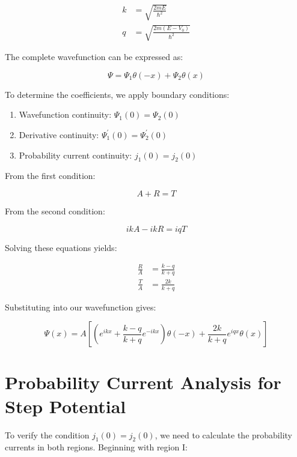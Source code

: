 \begin{align}
k & =\sqrt{\frac{2 m E}{\hbar^{2}}}  \\
q & =\sqrt{\frac{2 m\left(E-V_{0}\right)}{\hbar^{2}}}
\end{align}

The complete wavefunction can be expressed as:

\begin{equation}
\Psi=\Psi_{1} \theta(-x)+\Psi_{2} \theta(x)
\end{equation}

To determine the coefficients, we apply boundary conditions:

\begin{enumerate}
  \item Wavefunction continuity: $\Psi_{1}(0)=\Psi_{2}(0)$
  \item Derivative continuity: $\Psi_{1}^{\prime}(0)=\Psi_{2}^{\prime}(0)$
  \item Probability current continuity: $j_{1}(0)=j_{2}(0)$
\end{enumerate}

From the first condition:

\begin{equation}
A+R=T
\end{equation}

From the second condition:

\begin{equation}
i k A-i k R=i q T
\end{equation}

Solving these equations yields:

\begin{align}
\frac{R}{A} & =\frac{k-q}{k+q} \\
\frac{T}{A} & =\frac{2 k}{k+q}
\end{align}

Substituting into our wavefunction gives:

\begin{equation}
\Psi(x)=A\left[\left(e^{i k x}+\frac{k-q}{k+q} e^{-i k x}\right) \theta(-x)+\frac{2 k}{k+q} e^{i q x} \theta(x)\right]
\end{equation}


\section{Probability Current Analysis for Step Potential}

To verify the condition $j_{1}(0)=j_{2}(0)$, we need to calculate the probability currents in both regions. Beginning with region I:

